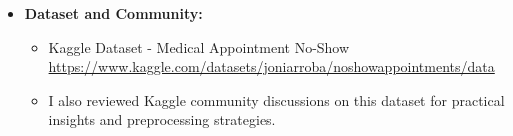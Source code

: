 \documentclass[12pt]{article}
\begin{document}
\begin{itemize}
    \item \textbf{Dataset and Community:}
    \begin{itemize}
        \item Kaggle Dataset - Medical Appointment No-Show \\
        \url{https://www.kaggle.com/datasets/joniarroba/noshowappointments/data}
        \item I also reviewed Kaggle community discussions on this dataset for practical insights and preprocessing strategies.
    \end{itemize}
\end{itemize}
\end{document}
